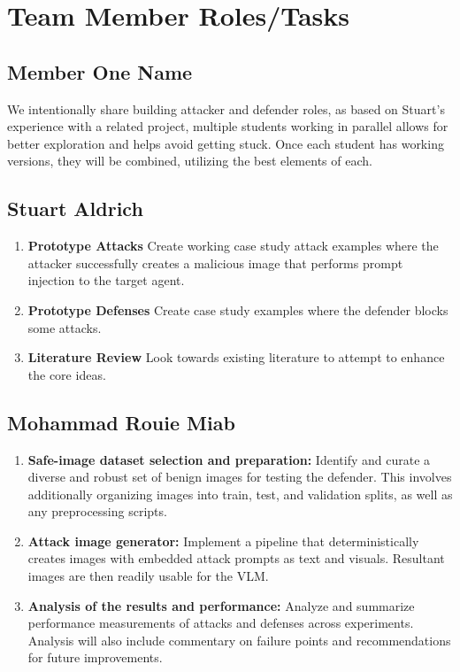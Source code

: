\documentclass[10pt,twocolumn,letterpaper]{article}
\begin{document}
\section{Team Member Roles/Tasks}
\label{sec:roles}

\subsection{Member One Name}

We intentionally share building attacker and defender roles, as based on Stuart's experience with a related project, multiple students working in parallel allows for better exploration and helps avoid getting stuck. Once each student has working versions, they will be combined, utilizing the best elements of each.

\subsection{Stuart Aldrich}

\begin{enumerate}

    \item \textbf{Prototype Attacks} Create working case study attack examples where the attacker successfully creates a malicious image that performs prompt injection to the target agent.
    \item \textbf{Prototype Defenses} Create case study examples where the defender blocks some attacks.
    \item \textbf{Literature Review} Look towards existing literature to attempt to enhance the core ideas.

\end{enumerate}

\subsection{Mohammad Rouie Miab}

\begin{enumerate}

    \item \textbf{Safe-image dataset selection and preparation:} Identify and curate a diverse and robust set of benign images for testing the defender. This involves additionally organizing images into train, test, and validation splits, as well as any preprocessing scripts.
    \item \textbf{Attack image generator:} Implement a pipeline that deterministically creates images with embedded attack prompts as text and visuals. Resultant images are then readily usable for the VLM.
    \item \textbf{Analysis of the results and performance:} Analyze and summarize performance measurements of attacks and defenses across experiments. Analysis will also include commentary on failure points and recommendations for future improvements.

\end{enumerate}
\end{document}
